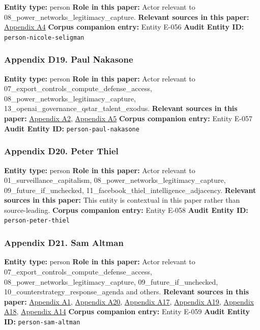 \documentclass[
  american,
  11pt,
  letterpaper,
]{article}
\begin{document}
\textbf{Entity type:} person \textbf{Role in this paper:} Actor relevant
to 08\_power\_networks\_legitimacy\_capture. \textbf{Relevant sources in
this paper:}
\hyperref[ch-08-appendix-a4-openai-announces-new-members-to-board-of-directors]{Appendix
A4} \textbf{Corpus companion entry:} Entity E-056 \textbf{Audit Entity
ID:} \texttt{person-nicole-seligman}

\subsubsection{Appendix D19. Paul
Nakasone}\label{ch-08-appendix-d19-paul-nakasone}

\textbf{Entity type:} person \textbf{Role in this paper:} Actor relevant
to 07\_export\_controls\_compute\_defense\_access,
08\_power\_networks\_legitimacy\_capture,
13\_openai\_governance\_qstar\_talent\_exodus. \textbf{Relevant sources
in this paper:}
\hyperref[ch-08-appendix-a2-openai-appoints-former-top-us-cyberwarrior-paul-nakasone-to-its-board-of-directors]{Appendix
A2},
\hyperref[ch-08-appendix-a5-openai-board-forms-safety-and-security-committee]{Appendix
A5} \textbf{Corpus companion entry:} Entity E-057 \textbf{Audit Entity
ID:} \texttt{person-paul-nakasone}

\subsubsection{Appendix D20. Peter
Thiel}\label{ch-08-appendix-d20-peter-thiel}

\textbf{Entity type:} person \textbf{Role in this paper:} Actor relevant
to 01\_surveillance\_capitalism,
08\_power\_networks\_legitimacy\_capture, 09\_future\_if\_unchecked,
11\_facebook\_thiel\_intelligence\_adjacency. \textbf{Relevant sources
in this paper:} This entity is contextual in this paper rather than
source-leading. \textbf{Corpus companion entry:} Entity E-058
\textbf{Audit Entity ID:} \texttt{person-peter-thiel}

\subsubsection{Appendix D21. Sam
Altman}\label{ch-08-appendix-d21-sam-altman}

\textbf{Entity type:} person \textbf{Role in this paper:} Actor relevant
to 07\_export\_controls\_compute\_defense\_access,
08\_power\_networks\_legitimacy\_capture, 09\_future\_if\_unchecked,
10\_counterstrategy\_response\_agenda and others. \textbf{Relevant
sources in this paper:}
\hyperref[ch-08-appendix-a1-openai-announces-leadership-transition]{Appendix
A1},
\hyperref[ch-08-appendix-a20-openais-proposals-for-the-us-ai-action-plan]{Appendix
A20}, \hyperref[ch-08-appendix-a17-musk-v-altman-4-24-cv-04722]{Appendix
A17},
\hyperref[ch-08-appendix-a19-judge-denies-elon-musks-attempt-to-immediately-block-openais-conversion-to-for-profit-entity]{Appendix
A19},
\hyperref[ch-08-appendix-a18-judge-denies-elon-musk-s-request-to-block-openai-for-profit-conversion-but-welcomes-trial]{Appendix
A18},
\hyperref[ch-08-appendix-a14-sam-altman-s-manifest-destiny]{Appendix
A14} \textbf{Corpus companion entry:} Entity E-059 \textbf{Audit Entity
ID:} \texttt{person-sam-altman}
\end{document}
